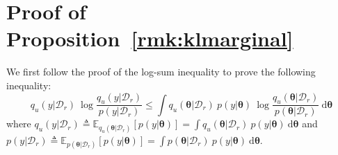 \documentclass{article}
\theoremstyle{definition}
\newcommand{\mbf}[1]{\mathbf{#1}}
\newcommand{\mcl}[1]{\mathcal{#1}}
\newcommand{\mbb}[1]{\mathbb{#1}}
\newcommand{\dc}{\mcl{D}_r}
\begin{document}
\section{Proof of Proposition~\ref{rmk:klmarginal}}
\label{app:klmarginal}
%
We first follow the proof of the log-sum inequality to prove the following inequality:
%
%
\begin{equation}
q_u(y|\dc)\ \log \frac{q_u(y|\dc)}{p(y|\dc)}
\le \int q_u(\bm{\theta}|\dc)\  p(y|\bm{\theta})\ \log \frac{q_u(\bm{\theta}|\dc)}{p(\bm{\theta}|\dc)}\ \text{d}\bm{\theta}
\label{eq:logsum2}
\end{equation}
%
where $q_u(y|\dc) \triangleq \mbb{E}_{q_u(\bm{\theta}|\dc)}[p(y|\bm{\theta})] = \int q_u(\bm{\theta}|\dc)\  p(y|\bm{\theta})\ \text{d}\bm{\theta}$ and $p(y|\dc) \triangleq \mbb{E}_{p(\bm{\theta}|\dc)}[p(y|\bm{\theta})] = \int p(\bm{\theta}|\dc)\  p(y|\bm{\theta})\ \text{d}\bm{\theta}$.
%
\end{document}
